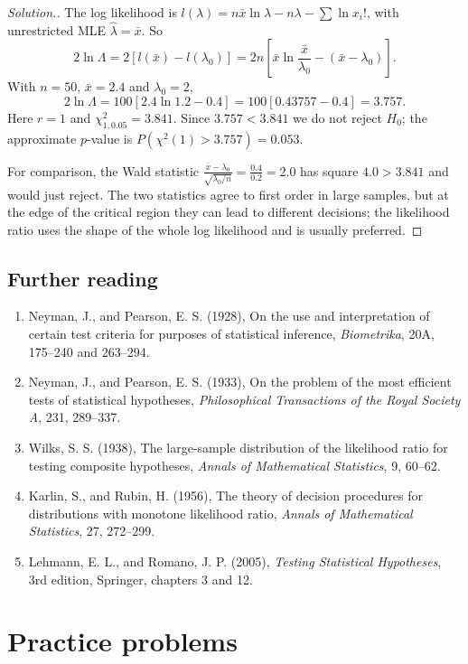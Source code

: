 \documentclass[12pt,a4paper]{report}
\theoremstyle{definition}
\theoremstyle{plain}
\newenvironment{solution}
  {\renewcommand{\qedsymbol}{}\begin{proof}[\textit{Solution}.]}
  {\end{proof}}
\begin{document}
\begin{solution}
The log likelihood is $l(\lambda) = n\bar x\ln\lambda - n\lambda - \sum\ln x_i!$,
with unrestricted MLE $\hat\lambda = \bar x$. So
\[2\ln\Lambda = 2\left[l(\bar x) - l(\lambda_0)\right]
= 2n\left[\bar x\ln\frac{\bar x}{\lambda_0} - (\bar x - \lambda_0)\right].\]
With $n = 50$, $\bar x = 2.4$ and $\lambda_0 = 2$,
\[2\ln\Lambda = 100\left[2.4\ln 1.2 - 0.4\right] = 100\left[0.43757 - 0.4\right] = 3.757 .\]
Here $r = 1$ and $\chi^2_{1,0.05} = 3.841$. Since $3.757<3.841$ we do not reject
$H_0$; the approximate $p$-value is $P(\chi^2(1)>3.757) = 0.053$.

For comparison, the Wald statistic $\frac{\bar x - \lambda_0}{\sqrt{\lambda_0/n}} =
\frac{0.4}{0.2} = 2.0$ has square $4.0>3.841$ and would just reject. The two
statistics agree to first order in large samples, but at the edge of the critical
region they can lead to different decisions; the likelihood ratio uses the shape
of the whole log likelihood and is usually preferred.
\end{solution}

\subsection*{Further reading}
\begin{enumerate}
\item Neyman, J., and Pearson, E. S. (1928), On the use and interpretation of
certain test criteria for purposes of statistical inference, \emph{Biometrika},
20A, 175--240 and 263--294.
\item Neyman, J., and Pearson, E. S. (1933), On the problem of the most efficient
tests of statistical hypotheses, \emph{Philosophical Transactions of the Royal
Society A}, 231, 289--337.
\item Wilks, S. S. (1938), The large-sample distribution of the likelihood ratio
for testing composite hypotheses, \emph{Annals of Mathematical Statistics}, 9,
60--62.
\item Karlin, S., and Rubin, H. (1956), The theory of decision procedures for
distributions with monotone likelihood ratio, \emph{Annals of Mathematical
Statistics}, 27, 272--299.
\item Lehmann, E. L., and Romano, J. P. (2005), \emph{Testing Statistical
Hypotheses}, 3rd edition, Springer, chapters 3 and 12.
\end{enumerate}


\section{Practice problems}
\end{document}
